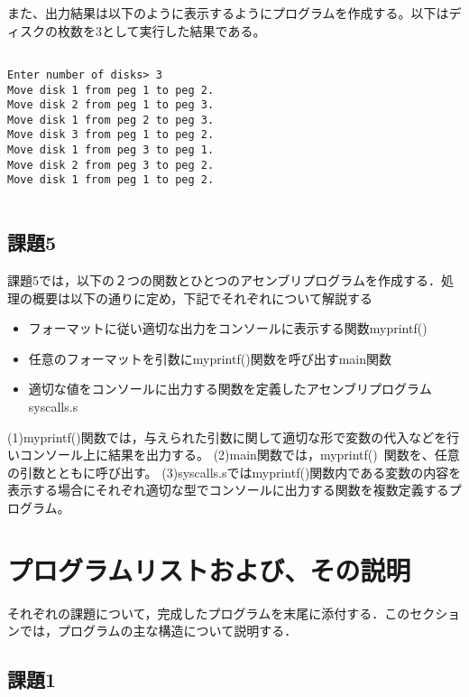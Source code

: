 \documentclass[a4j]{jarticle}
\begin{document}
また、出力結果は以下のように表示するようにプログラムを作成する。以下はディスクの枚数を3として実行した結果である。

{\baselineskip 3mm
\begin{verbatim}

Enter number of disks> 3
Move disk 1 from peg 1 to peg 2.
Move disk 2 from peg 1 to peg 3.
Move disk 1 from peg 2 to peg 3.
Move disk 3 from peg 1 to peg 2.
Move disk 1 from peg 3 to peg 1.
Move disk 2 from peg 3 to peg 2.
Move disk 1 from peg 1 to peg 2.
 
\end{verbatim}
}



\subsection{課題5}

課題5では，以下の２つの関数とひとつのアセンブリプログラムを作成する．処理の概要は以下の通りに定め，下記でそれぞれについて解説する

\begin{itemize}
\item[(1)]フォーマットに従い適切な出力をコンソールに表示する関数myprintf()
\item[(2)]任意のフォーマットを引数にmyprintf()関数を呼び出すmain関数
\item[(3)]適切な値をコンソールに出力する関数を定義したアセンブリプログラムsyscalls.s
\end{itemize}


(1)myprintf()関数では，与えられた引数に関して適切な形で変数の代入などを行いコンソール上に結果を出力する。
(2)main関数では，myprintf() 関数を、任意の引数とともに呼び出す。
(3)syscalls.sではmyprintf()関数内である変数の内容を表示する場合にそれぞれ適切な型でコンソールに出力する関数を複数定義するプログラム。



%
%

\section{プログラムリストおよび、その説明}

それぞれの課題について，完成したプログラムを末尾に添付する．このセクションでは，プログラムの主な構造について説明する．

\subsection{課題1}
\end{document}
